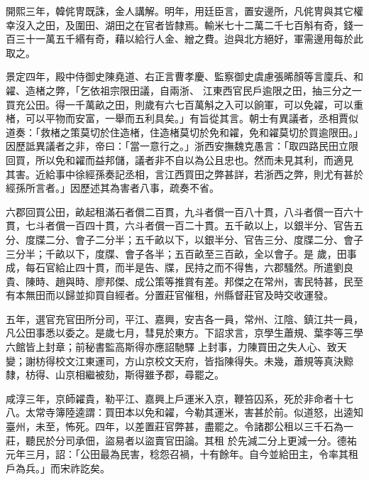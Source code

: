 \begin{pinyinscope}
 開熙三年，韓侂冑既誅，金人講解。明年，用廷臣言，置安邊所，凡侂冑與其它權幸沒入之田，及圍田、湖田之在官者皆隸焉。輸米七十二萬二千七百斛有奇，錢一百三十一萬五千緡有奇，藉以給行人金、繒之費。迨與北方絕好，軍需邊用每於此取之。



 景定四年，殿中侍御史陳堯道、右正言曹孝慶、監察御史虞慮張晞顏等言廩兵、和糴、造楮之弊，「乞依祖宗限田議，自兩浙、
 江東西官民戶逾限之田，抽三分之一買充公田。得一千萬畝之田，則歲有六七百萬斛之入可以餉軍，可以免糴，可以重楮，可以平物而安富，一舉而五利具矣。」有旨從其言。朝士有異議者，丞相賈似道奏：「救楮之策莫切於住造楮，住造楮莫切於免和糴，免和糴莫切於買逾限田。」因歷詆異議者之非，帝曰：「當一意行之。」浙西安撫魏克愚言：「取四路民田立限回買，所以免和糴而益邦儲，議者非不自以為公且忠也。然而未見其利，而適見
 其害。近給事中徐經孫奏記丞相，言江西買田之弊甚詳，若浙西之弊，則尤有甚於經孫所言者。」因歷述其為害者八事，疏奏不省。



 六郡回買公田，畝起租滿石者償二百貫，九斗者償一百八十貫，八斗者償一百六十貫，七斗者償一百四十貫，六斗者償一百二十貫。五千畝以上，以銀半分、官告五分、度牒二分、會子二分半；五千畝以下，以銀半分、官告三分、度牒二分、會子三分半；千畝以下，度牒、會子各半；五百畝至三百畝，全以會子。是
 歲，田事成，每石官給止四十貫，而半是告、牒，民持之而不得售，六郡騷然。所遣劉良貴、陳時、趙與時、廖邦傑、成公策等推賞有差。邦傑之在常州，害民特甚，民至有本無田而以歸並抑買自經者。分置莊官催租，州縣督莊官及時交收運發。



 五年，選官充官田所分司，平江、嘉興，安吉各一員，常州、江陰、鎮江共一員，凡公田事悉以委之。是歲七月，彗見於東方。下詔求言，京學生蕭規、葉李等三學六館皆上封章；前秘書監高斯得亦應詔馳驛
 上封事，力陳買田之失人心、致天變；謝枋得校文江東運司，方山京校文天府，皆指陳得失。未幾，蕭規等真決黥隸，枋得、山京相繼被劾，斯得雖予郡，尋罷之。



 咸淳三年，京師糴貴，勒平江、嘉興上戶運米入京，鞭笞囚系，死於非命者十七八。太常寺簿陸逵謂：買田本以免和糴，今勒其運米，害甚於前。似道怒，出逵知臺州，未至，怖死。四年，以差置莊官弊甚，盡罷之。令諸郡公租以三千石為一莊，聽民於分司承佃，盜易者以盜賣官田論。其租
 於先減二分上更減一分。德祐元年三月，詔：「公田最為民害，稔怨召禍，十有餘年。自今並給田主，令率其租戶為兵。」而宋祚訖矣。



\end{pinyinscope}